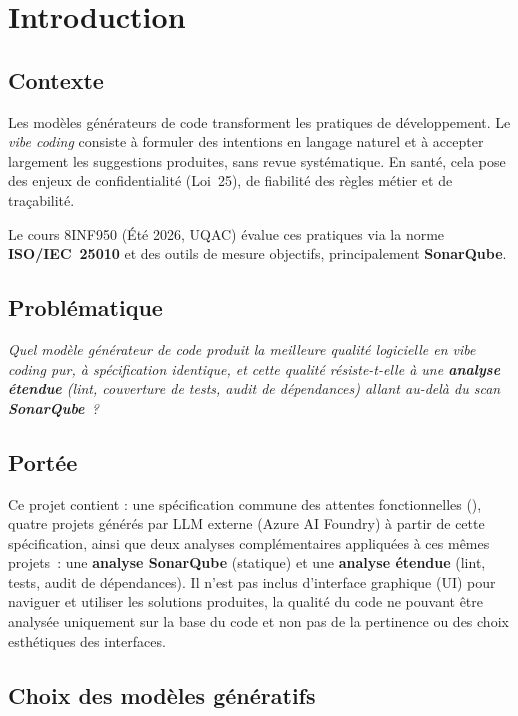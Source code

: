 \documentclass[12pt, a4paper]{article}
\newcommand{\code}[1]{\path{#1}}
\begin{document}
\section{Introduction}

\subsection{Contexte}

Les modèles générateurs de code transforment les pratiques de développement. Le
\emph{vibe coding} consiste à formuler des intentions en langage naturel et à accepter
largement les suggestions produites, sans revue systématique. En santé, cela pose des
enjeux de confidentialité (Loi~25), de fiabilité des règles métier et de traçabilité.

Le cours 8INF950 (Été 2026, UQAC) évalue ces pratiques via la norme \textbf{ISO/IEC~25010}
et des outils de mesure objectifs, principalement \textbf{SonarQube}.

\subsection{Problématique}

\emph{Quel modèle générateur de code produit la meilleure qualité logicielle en vibe
coding pur, à spécification identique, et cette qualité résiste-t-elle à une
\textbf{analyse étendue} (lint, couverture de tests, audit de dépendances) allant au-delà
du scan \textbf{SonarQube}~?}

\subsection{Portée}
Ce projet contient : une spécification commune des attentes fonctionnelles
(\code{docs/cahier-des-charges.md}), quatre projets générés par LLM externe (Azure AI
Foundry) à partir de cette spécification, ainsi que deux analyses complémentaires appliquées
à ces mêmes projets~: une \textbf{analyse SonarQube} (statique) et une \textbf{analyse
étendue} (lint, tests, audit de dépendances). Il n'est pas inclus d'interface graphique (UI)
pour naviguer et utiliser les solutions produites, la qualité du code ne pouvant être
analysée uniquement sur la base du code et non pas de la pertinence ou des choix esthétiques
des interfaces.

\subsection{Choix des modèles génératifs}
\end{document}
